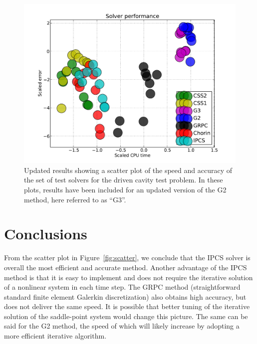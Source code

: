 \begin{figure}
    \caption{Updated results showing a scatter plot of the speed and
      accuracy of the set of test solvers for the driven cavity test
      problem. In these plots, results have been included for an
      updated version of the G2 method, here referred to as ``G3''.}
  \label{fig:g3scatter}
  \includegraphics[width=\largefig]{chapters/kvs-1/pdf/drivencavity-scatter.pdf}
\end{figure}

\section{Conclusions}

From the scatter plot in Figure~\ref{fig:scatter}, we conclude that
the IPCS solver is overall the most efficient and accurate
method. Another advantage of the IPCS method is that it is easy to
implement and does not require the iterative solution of a nonlinear
system in each time step. The GRPC method (straightforward standard
finite element Galerkin discretization) also obtains high accuracy,
but does not deliver the same speed. It is possible that better tuning
of the iterative solution of the saddle-point system would change this
picture. The same can be said for the G2 method, the speed of which
will likely increase by adopting a more efficient iterative algorithm.
